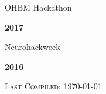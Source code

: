 \documentclass[10pt]{article}
\newenvironment{bottompar}{\par\vspace*{\fill}}{\clearpage}
\newcommand{\headstyle}{\scshape \normalsize \textcolor{light-gray}}
\begin{document}
\begin{minipage}[t]{.85\linewidth}
\flushleft
\noindent
OHBM Hackathon
\end{minipage}
\hfill
\begin{minipage}[t]{.15\linewidth}
\flushright
\noindent
\textsc{\textbf{2017}}
\end{minipage}

\begin{minipage}[t]{.85\linewidth}
\flushleft
\noindent
Neurohackweek
\end{minipage}
\hfill
\begin{minipage}[t]{.15\linewidth}
\flushright
\noindent
\textsc{\textbf{2016}}
\end{minipage}

\begin{bottompar}
	\begin{center}
		\headstyle{Last Compiled: \today}
	\end{center}
\end{bottompar}
\end{document}
